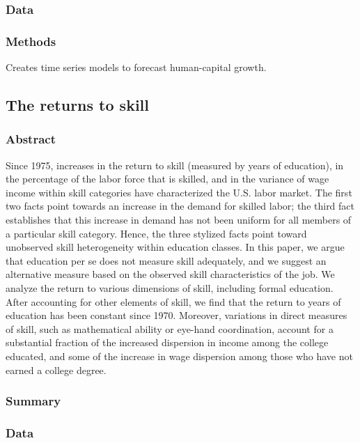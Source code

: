 \documentclass[12pt]{article}
\begin{document}
\subsubsection*{Data}

\subsubsection*{Methods}

Creates time series models to forecast human-capital growth.


\subsection*{The returns to skill}

\subsubsection*{Abstract}
Since 1975, increases in the return to skill (measured by years of education), in the percentage of the labor force that is skilled, and in the variance of wage income within skill categories have characterized the U.S. labor market. The first two facts point towards an increase in the demand for skilled labor; the third fact establishes that this increase in demand has not been uniform for all members of a particular skill category. Hence, the three stylized facts point toward unobserved skill heterogeneity within education classes. In this paper, we argue that education per se does not measure skill adequately, and we suggest an alternative measure based on the observed skill characteristics of the job. We analyze the return to various dimensions of skill, including formal education. After accounting for other elements of skill, we find that the return to years of education has been constant since 1970. Moreover, variations in direct measures of skill, such as mathematical ability or eye-hand coordination, account for a substantial fraction of the increased dispersion in income among the college educated, and some of the increase in wage dispersion among those who have not earned a college degree.
\subsubsection*{Summary}

\subsubsection*{Data}
\end{document}
